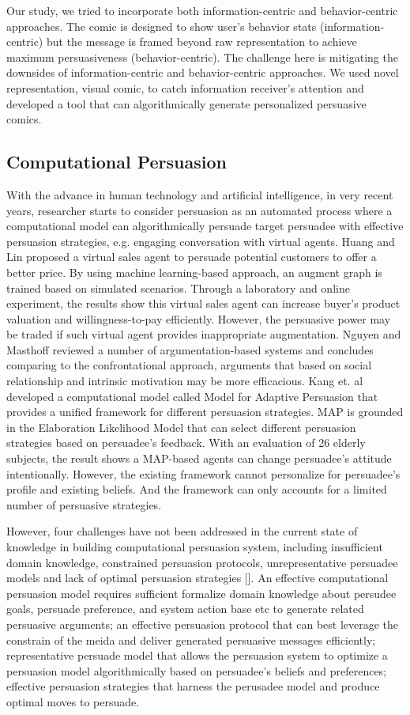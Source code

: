 Our study, we tried to incorporate both information-centric and behavior-centric approaches. The comic is designed to show user's behavior stats (information-centric) but the message is framed beyond raw representation to achieve maximum persuasiveness (behavior-centric). The challenge here is mitigating the downsides of information-centric and behavior-centric approaches. We used novel representation, visual comic, to catch information receiver's attention and developed a tool that can algorithmically generate personalized persuasive comics.\par


\subsection{Computational Persuasion}
With the advance in human technology and artificial intelligence, in very recent years, researcher starts to consider persuasion as an automated process where a computational model can algorithmically persuade target persuadee with effective persuasion strategies, e.g. engaging conversation with virtual agents. Huang and Lin proposed a virtual sales agent to persuade potential customers to offer a better price. By using machine learning-based approach, an augment graph is trained based on simulated scenarios. Through a laboratory and online experiment, the results show this virtual sales agent can increase buyer's product valuation and willingness-to-pay efficiently. However, the persuasive power may be traded if such virtual agent provides inappropriate augmentation. Nguyen and Masthoff reviewed a number of argumentation-based systems and concludes comparing to the confrontational approach, arguments that based on social relationship and intrinsic motivation may be more efficacious. Kang et. al developed a computational model called Model for Adaptive Persuasion that provides a unified framework for different persuasion strategies. MAP is grounded in the Elaboration Likelihood Model that can select different persuasion strategies based on persuadee's feedback. With an evaluation of 26 elderly subjects, the result shows a MAP-based agents can change persuadee's attitude intentionally. However, the existing framework cannot personalize for persuadee's profile and existing beliefs. And the framework can only accounts for a limited number of persuasive strategies.\par
However, four challenges have not been addressed in the current state of knowledge in building computational persuasion system, including insufficient domain knowledge, constrained persuasion protocols, unrepresentative persuadee models and lack of optimal persuasion strategies []. An effective computational persuasion model requires sufficient formalize domain knowledge about persudee goals, persuade preference, and system action base etc to generate related persuasive arguments; an effective persuasion protocol that can best leverage the constrain of the meida and deliver generated persuasive messages efficiently; representative persuade model that allows the persuasion system to optimize a persuasion model algorithmically based on persuadee's beliefs and preferences; effective persuasion strategies that harness the perusadee model and produce optimal moves to persuade. \par
